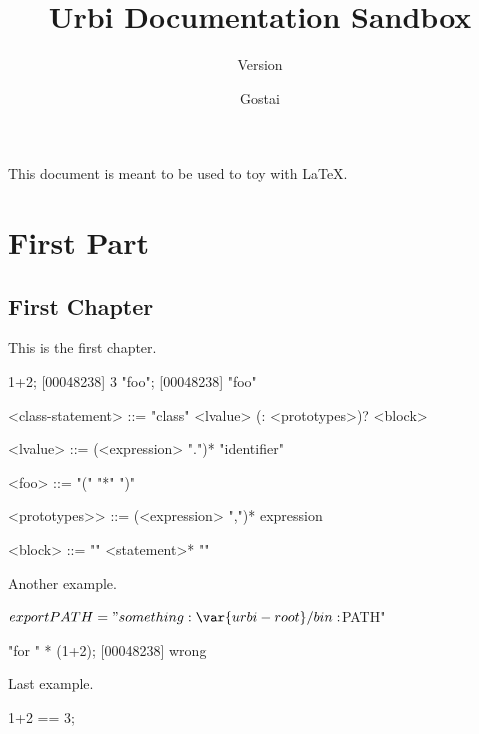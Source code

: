 \documentclass[openright,twoside,11pt]{book}
\title{Urbi Documentation Sandbox}
\subtitle{Version \VcsDescription}
\author{Gostai}
\begin{document}
\maketitle

This document is meant to be used to toy with \LaTeX{}.

\tableofcontents
\part{First Part}

\chapter{First Chapter}

This is the first chapter.

\begin{urbiscript}
1+2;
[00048238] 3
"foo";
[00048238] "foo"
\end{urbiscript}

\begin{bnf}
<class-statement>
  ::= "class" <lvalue> (: <prototypes>)? <block>

<lvalue>
  ::= (<expression> ".")* "identifier"

<foo>
  ::= "(" "*" ")"

<prototypes>>
  ::= (<expression> ",")* expression

<block>
  ::= "{" <statement>* "}"
\end{bnf}

Another example.

\begin{shell}[style=varInString]
$ export PATH="something:\var{urbi-root}/bin:$PATH"
\end{shell}%

\begin{urbiunchecked}[style=varInString]
"for " * (1+2);
[00048238] wrong
\end{urbiunchecked}

Last example.

\begin{urbiassert}
1+2 == 3;
\end{urbiassert}

\newcommand{\release}[2]{%
  \ifx\ifHtml\undefined%
    Released on #2.
    \marginpar{%
      \texttt{[image: figs/urbi-sdk/\#1/cube]}

      #2.
    }%
  \else
    \texttt{[image: figs/urbi-sdk/\#1/cube]},
    released on #2.
  \fi%
}
\end{document}
